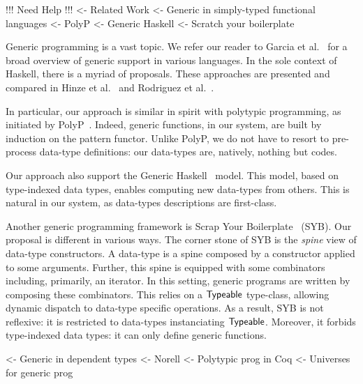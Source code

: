 \begin{wstructure}
!!! Need Help !!!
<- Related Work
    <- Generic in simply-typed functional languages
        <- PolyP \cite{jansson:polyp}
        <- Generic Haskell \cite{hinze:generic-haskell}
        <- Scratch your boilerplate \cite{spj:syb}
\end{wstructure}

Generic programming is a vast topic. We refer our reader to Garcia et
al.~\cite{garcia:generic-comparative-study} for a broad overview of
generic support in various languages. In the sole context of Haskell,
there is a myriad of proposals. These approaches are presented and
compared in Hinze et al.~\cite{hinze:generic-approach-comparative} and
Rodriguez et al.~\cite{rodriguez:generic-libs-comparative}.

In particular, our approach is similar in spirit with polytypic
programming, as initiated by PolyP~\cite{jansson:polyp}. Indeed,
generic functions, in our system, are built by induction on the
pattern functor. Unlike PolyP, we do not have to resort to pre-process
data-type definitions: our data-types are, natively, nothing but
codes.

Our approach also support the Generic
Haskell~\cite{hinze:generic-haskell} model. This model, based on
type-indexed data types, enables computing new data-types from
others. This is natural in our system, as data-types descriptions are
first-class.

Another generic programming framework is Scrap Your
Boilerplate~\cite{spj:syb} (SYB). Our proposal is different in various
ways. The corner stone of SYB is the \emph{spine} view of data-type
constructors. A data-type is a spine composed by a constructor applied
to some arguments. Further, this spine is equipped with some
combinators including, primarily, an iterator. In this setting,
generic programs are written by composing these combinators. This
relies on a $\textsf{Typeable}$ type-class, allowing dynamic dispatch to
data-type specific operations. As a result, SYB is not reflexive: it
is restricted to data-types instanciating $\textsf{Typeable}$. Moreover,
it forbids type-indexed data types: it can only define generic
functions.


\begin{wstructure}
    <- Generic in dependent types
        <- Norell \cite{norell:msc-thesis}
        <- Polytypic prog in Coq \cite{verbruggen:polytype-coq}
        <- Universes for generic prog \cite{benke:universe-generic-prog}
\end{wstructure}

